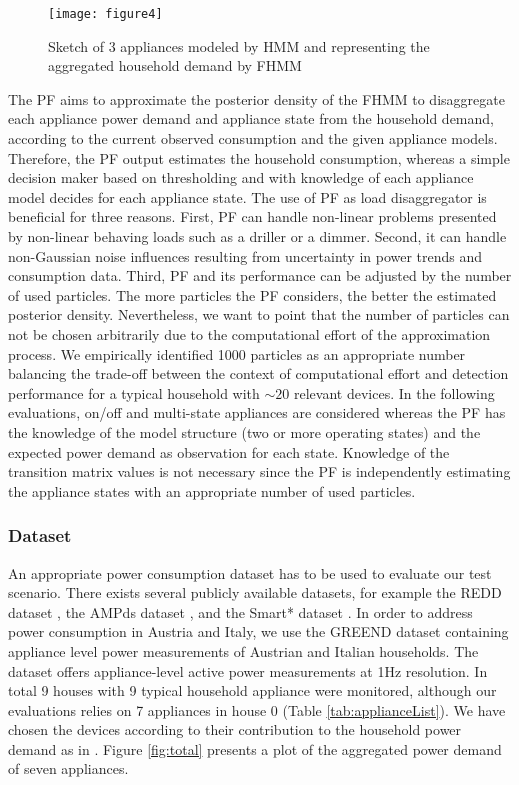 \documentclass{article}
\begin{document}
\begin{figure}[h!]
\centering
\texttt{[image: figure4]}
\caption{Sketch of 3 appliances modeled by \ac{HMM} and representing the aggregated household demand by \ac{FHMM}}
\label{fig:HMM}
\end{figure}

The \ac{PF} aims to approximate the posterior density of the \ac{FHMM} to disaggregate each appliance power demand and appliance state from the household demand, according to the current observed consumption and the given appliance models.
Therefore, the \ac{PF} output estimates the household consumption, whereas a simple decision maker based on thresholding and with knowledge of each appliance model decides for each appliance state.
The use of \ac{PF} as load disaggregator is beneficial for three reasons.
First, \ac{PF} can handle non-linear problems presented by non-linear behaving loads such as a driller or a dimmer.
Second, it can handle non-Gaussian noise influences resulting from uncertainty in power trends and consumption data.
Third, \ac{PF} and its performance can be adjusted by the number of used particles.
The more particles the \ac{PF} considers, the better the estimated posterior density.
Nevertheless, we want to point that the number of particles can not be chosen arbitrarily due to the computational effort of the approximation process.
We empirically identified 1000 particles as an appropriate number balancing the trade-off between the context of computational effort and detection performance for a typical household with $\sim20$ relevant devices.
In the following evaluations, on/off and multi-state appliances are considered whereas the \ac{PF} has the knowledge of the model structure (two or more operating states) and the expected power demand as observation for each state.
Knowledge of the transition matrix values is not necessary since the \ac{PF} is independently estimating the appliance states with an appropriate number of used particles.

\subsubsection{Dataset}
An appropriate power consumption dataset has to be used to evaluate our test scenario.
There exists several publicly available datasets, for example the REDD dataset \cite{kolter-kdd-2011}, the AMPds dataset \cite{makonin2013ampds}, and the Smart* dataset \cite{barker2012smart}.
In order to address power consumption in Austria and Italy, we use the GREEND dataset \cite{Andrea2014} containing appliance level power measurements of Austrian and Italian households.
The dataset offers appliance-level active power measurements at 1Hz resolution.
In total 9 houses with 9 typical household appliance were monitored, although our evaluations relies on 7 appliances in house 0 (Table \ref{tab:applianceList}).
We have chosen the devices according to their contribution to the household power demand as in \cite{Carlson2013132}.
Figure \ref{fig:total} presents a plot of the aggregated power demand of seven appliances.
\end{document}
